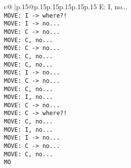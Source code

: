 \documentclass{article}
\begin{document}
{\begin{supertabular}{c@{$\;$}|p{.15\linewidth}@{}p{.15\linewidth}p{.15\linewidth}p{.15\linewidth}p{.15\linewidth}p{.15\linewidth}}
{{{E: I, no...\\ \tt  MOVE: I -> where?!\\ \tt  MOVE: I -> no...\\ \tt  MOVE: C -> no...\\ \tt  MOVE: C, no...\\ \tt  MOVE: C -> no...\\ \tt  MOVE: C, no...\\ \tt  MOVE: C, no...\\ \tt  MOVE: I -> no...\\ \tt  MOVE: C -> no...\\ \tt  MOVE: C, no...\\ \tt  MOVE: I, no...\\ \tt  MOVE: C -> no...\\ \tt  MOVE: C -> where?!\\ \tt  MOVE: C, no...\\ \tt  MOVE: I, no...\\ \tt  MOVE: I -> no...\\ \tt  MOVE: C -> no...\\ \tt  MOVE: C, no...\\ \tt  MO}}}
\end{supertabular}}
\end{document}
